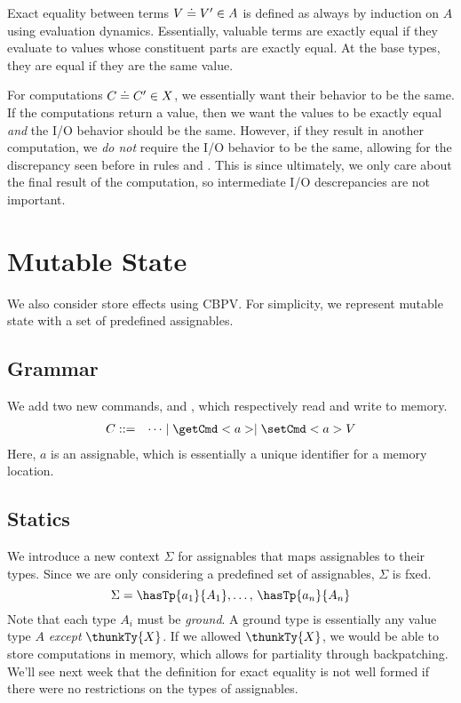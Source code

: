 \documentclass[letterpaper]{article}
\begin{document}
Exact equality between terms $V \doteq V' \in A$ is defined as always by induction on $A$ using evaluation dynamics. Essentially, valuable terms are exactly equal if they evaluate to values whose constituent parts are exactly equal. At the base types, they are equal if they are the same value.

For computations $C \doteq C' \in X$, we essentially want their behavior to be the same. If the computations return a value, then we want the values to be exactly equal \emph{and} the I/O behavior should be the same. However, if they result in another computation, we \emph{do not} require the I/O behavior to be the same, allowing for the discrepancy seen before in rules  and . This is since ultimately, we only care about the final result of the computation, so intermediate I/O descrepancies are not important.

\section{Mutable State}
We also consider store effects using CBPV. For simplicity, we represent mutable state with a set of predefined assignables.

\subsection{Grammar}
We add two new commands,  and , which respectively read and write to memory.
\[
    \begin{array}{rl} 
        C ::= & \cdots \mid \getCmd<a> \mid \setCmd<a>{V}
    \end{array}
\]
Here, $a$ is an assignable, which is essentially a unique identifier for a memory location.

\subsection{Statics}
We introduce a new context $\Sigma$ for assignables that maps assignables to their types. Since we are only considering a predefined set of assignables, $\Sigma$ is fxed.
\[
  \Sigma = \hasTp{a_1}{A_1}, \ldots,\, \hasTp{a_n}{A_n}
\]
Note that each type $A_i$ must be \emph{ground}. A ground type is essentially any value type $A$ \emph{except} $\thunkTy{X}$. If we allowed $\thunkTy{X}$, we would be able to store computations in memory, which allows for partiality through backpatching. We'll see next week that the definition for exact equality is not well formed if there were no restrictions on the types of assignables.
\end{document}
